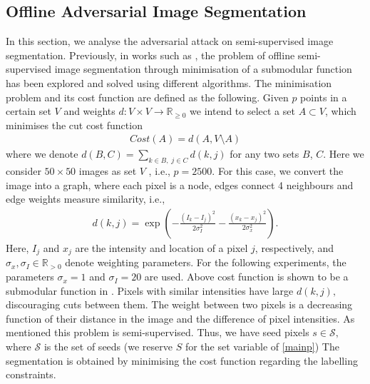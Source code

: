 \documentclass{article}
\theoremstyle{plain}
\theoremstyle{definition}
\theoremstyle{remark}
\newcommand{\R}{\mathbb{R}}
\begin{document}
\subsection{Offline Adversarial Image Segmentation}\label{app:offex2}
In this section, we analyse the adversarial attack on semi-supervised image segmentation. Previously, in works such as \cite{bach2013learning}, the problem of offline semi-supervised image segmentation through minimisation of a submodular function has been explored and solved using different algorithms. The minimisation problem and its cost function are defined as the following.
Given $p$ points in a certain set $V$ and weights $d:V\times V\to \R_{\geq 0}$ %
we intend 
to select a set $A\subset V$, which minimises the cut cost function 
\begin{align*}
    Cost(A) \!=\! d(A,V\setminus A)
\end{align*}
where we denote $d(B,C) = \sum_{k\in B,\;j\in C} d(k,j)$ for any two sets $B$, $C$. Here we consider $50\times50$ images as set $V$ , i.e., $p=2500.$ For this case, we convert the image into a graph, where each pixel is a node, %
edges connect 4 neighbours and edge weights measure similarity, i.e.,
\begin{align*}
    d(k,j) = \exp\left(-\frac{(I_k-I_j)^2}{2\sigma_I^2}-\frac{(x_k-x_j)^2}{2\sigma_x^2}\right).
\end{align*}
Here,
$I_j$ and $x_j$ are the intensity and location of a pixel $j$, respectively, and $\sigma_x,\sigma_I\in \R_{>0}$ denote weighting parameters. For the following experiments, the parameters $\sigma_x=1$ and $\sigma_I=20$ are used. 
Above cost function is shown to be a submodular function in \citep[Sec.~6]{bach2013learning}. 
Pixels with similar intensities have large $d(k,j),$ discouraging cuts between them. 
The weight between two pixels is a decreasing function of their distance in the image and the difference of pixel intensities. 
As mentioned this problem is semi-supervised. Thus, we have seed pixels $s\in \mathcal{S},$ where $\mathcal{S}$ is the set of seeds (we reserve $S$ for the set variable of \eqref{mainp}) The segmentation is obtained by minimising the cost function regarding the labelling constraints. 
\end{document}
